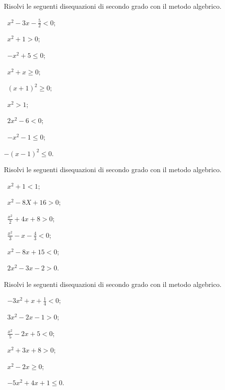 \begin{esercizio}[\Ast]
\label{ese:4.3}
Risolvi le seguenti disequazioni di secondo grado con il metodo algebrico.
\begin{multicols}{3}
 \begin{enumeratea}
 \item~$x^2-3x-\frac 5 2<0$;
 \item~$x^2+1>0$;
 \item~$-x^2+5\le 0$;
 \item~$x^2+x\ge 0$;
 \item~$(x+1)^2\ge 0$;
 \item~$x^2>1$;
 \item~$2x^2-6<0$;
 \item~$-x^2-1\le 0$;
 \item $-(x-1)^{2}\le 0$.
 \end{enumeratea}
 \end{multicols}
\end{esercizio}

\begin{esercizio}[\Ast]
\label{ese:4.4}
Risolvi le seguenti disequazioni di secondo grado con il metodo algebrico.
\begin{multicols}{3}
 \begin{enumeratea}
 \item~$x^2+1<1$;
 \item~$x^2-8X+16>0$;
 \item~$\frac{x^{2}}{2}+4x+8>0$;
 \item~$\frac{x^{2}}{3}-x-\frac{4}{3}<0$;
 \item~$x^2-8x+15<0$;
 \item~$2x^2-3x-2>0$.
 \end{enumeratea}
 \end{multicols}
\end{esercizio}

\begin{esercizio}[\Ast]
\label{ese:4.5}
Risolvi le seguenti disequazioni di secondo grado con il metodo algebrico.
\begin{multicols}{3}
 \begin{enumeratea}
 \item~$-3x^2+x+\frac 1 4<0$;
 \item~$3x^2-2x-1>0$;
 \item~$\frac{x^{2}}{5}-2x+5<0$;
 \item~$x^2+3x+8>0$;
 \item~$x^2-2x\ge 0$;
 \item~$-5x^2+4x+1\le 0$.
 \end{enumeratea}
 \end{multicols}
\end{esercizio}

